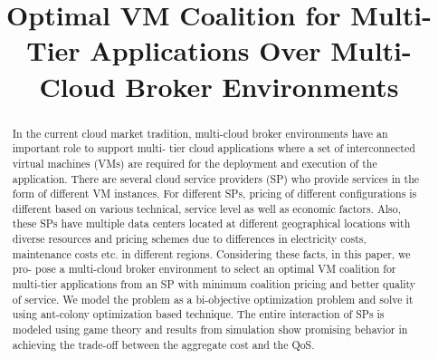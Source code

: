 \documentclass[conference]{IEEEtran}
\begin{document}
\title{Optimal VM Coalition for Multi-Tier Applications
	Over Multi-Cloud Broker Environments\\

{\footnotesize \textsuperscript{}}
}

\author{
\and
{}
\and
{}
\and
{}
}

\maketitle
\pagestyle{plain} 
\begin{abstract}
In the current cloud market tradition, multi-cloud
broker environments have an important role to support multi-
tier cloud applications where a set of interconnected virtual
machines (VMs) are required for the deployment and execution
of the application. There are several cloud service providers (SP)
who provide services in the form of different VM instances. For
different SPs, pricing of different configurations is different based
on various technical, service level as well as economic factors.
Also, these SPs have multiple data centers located at different
geographical locations with diverse resources and pricing schemes
due to differences in electricity costs, maintenance costs etc. in
different regions. Considering these facts, in this paper, we pro-
pose a multi-cloud broker environment to select an optimal VM
coalition for multi-tier applications from an SP with minimum
coalition pricing and better quality of service. We model the
problem as a bi-objective optimization problem and solve it using
ant-colony optimization based technique. The entire interaction
of SPs is modeled using game theory and results from simulation
show promising behavior in achieving the trade-off between the
aggregate cost and the QoS.
\end{abstract}
\end{document}
